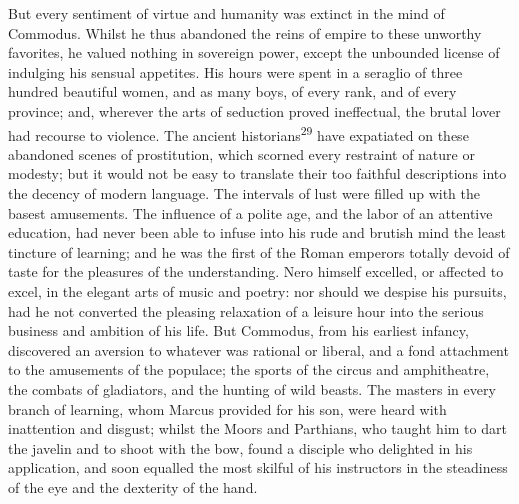 

But every sentiment of virtue and humanity was extinct in the
mind of Commodus. Whilst he thus abandoned the reins of empire to
these unworthy favorites, he valued nothing in sovereign power,
except the unbounded license of indulging his sensual appetites.
His hours were spent in a seraglio of three hundred beautiful
women, and as many boys, of every rank, and of every province;
and, wherever the arts of seduction proved ineffectual, the
brutal lover had recourse to violence. The ancient historians\textsuperscript{29}
have expatiated on these abandoned scenes of prostitution, which
scorned every restraint of nature or modesty; but it would not be
easy to translate their too faithful descriptions into the
decency of modern language. The intervals of lust were filled up
with the basest amusements. The influence of a polite age, and
the labor of an attentive education, had never been able to
infuse into his rude and brutish mind the least tincture of
learning; and he was the first of the Roman emperors totally
devoid of taste for the pleasures of the understanding. Nero
himself excelled, or affected to excel, in the elegant arts of
music and poetry: nor should we despise his pursuits, had he not
converted the pleasing relaxation of a leisure hour into the
serious business and ambition of his life. But Commodus, from his
earliest infancy, discovered an aversion to whatever was rational
or liberal, and a fond attachment to the amusements of the
populace; the sports of the circus and amphitheatre, the combats
of gladiators, and the hunting of wild beasts. The masters in
every branch of learning, whom Marcus provided for his son, were
heard with inattention and disgust; whilst the Moors and
Parthians, who taught him to dart the javelin and to shoot with
the bow, found a disciple who delighted in his application, and
soon equalled the most skilful of his instructors in the
steadiness of the eye and the dexterity of the hand.


